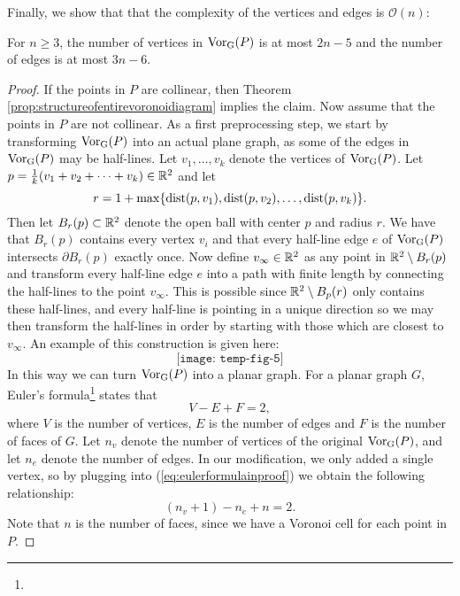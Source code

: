 Finally, we show that that the complexity of the vertices and edges is $\mathcal{O}(n)$:
\begin{thm}
For $n \geq 3$, the number of vertices in $\operatorname{Vor_{G}}(P)$ is at most $2n - 5$ and the number of edges is at most $3n - 6$.
\end{thm}
\begin{proof}
If the points in $P$ are collinear, then Theorem \ref{prop:structureofentirevoronoidiagram} implies the claim. Now assume that the points in $P$ are not collinear. As a first preprocessing step, we start by transforming $\operatorname{Vor_{G}}(P)$ into an actual plane graph, as some of the edges in $\operatorname{Vor_{G}}(P)$ may be half-lines. Let $v_1, \ldots, v_k$ denote the vertices of $\operatorname{Vor_{G}}(P)$. Let $p = \tfrac{1}{k}(v_1 + v_2 + \cdots + v_k) \in \mathbb{R}^2$ and let
\[
    r = 1 + \max\{\operatorname{dist}(p, v_1), \operatorname{dist}(p, v_2), \ldots, \operatorname{dist}(p, v_k)\}.
\]
Then let $B_r(p) \subset \mathbb{R}^2$ denote the open ball with center $p$ and radius $r$. We have that $B_r(p)$ contains every vertex $v_i$ and that every half-line edge $e$ of $\operatorname{Vor_{G}}(P)$ intersects $\partial B_r(p)$ exactly once. Now define $v_{\infty} \in \mathbb{R}^2$ as any point in $\mathbb{R}^2 \setminus B_r(p)$ and transform every half-line edge $e$ into a path with finite length by connecting the half-lines to the point $v_{\infty}$. This is possible since $\mathbb{R}^2 \setminus B_p(r)$ only contains these half-lines, and every half-line is pointing in a unique direction so we may then transform the half-lines in order by starting with those which are closest to $v_{\infty}$. An example of this construction is given here:
\[
    \texttt{[image: temp-fig-5]}
\]
In this way we can turn $\operatorname{Vor_{G}}(P)$ into a planar graph. For a planar graph $G$, Euler's formula\footnote{} states that
\begin{equation} \label{eq:eulerformulainproof}
    V - E + F = 2,
\end{equation}
where $V$ is the number of vertices, $E$ is the number of edges and $F$ is the number of faces of $G$. Let $n_v$ denote the number of vertices of the original $\operatorname{Vor_{G}}(P)$, and let $n_e$ denote the number of edges. In our modification, we only added a single vertex, so by plugging into (\ref{eq:eulerformulainproof}) we obtain the following relationship:
\[
    (n_v + 1) - n_e + n = 2.
\]
Note that $n$ is the number of faces, since we have a Voronoi cell for each point in $P$. 
\end{proof}

